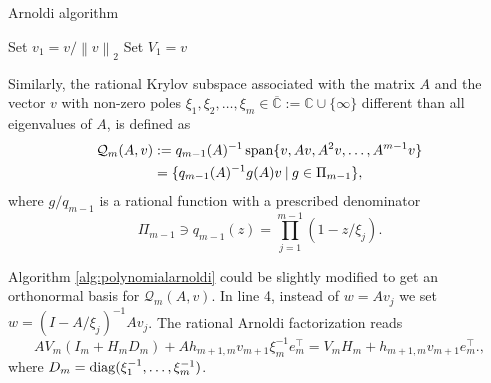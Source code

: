 \begin{algorithm}
    \caption{Arnoldi algorithm}
    \label{alg:polynomialarnoldi}
    Set $v_1 = v / \left\| v \right\|_2$\;
    Set $V_1 = v$\;
        \end{algorithm}

Similarly, the rational Krylov subspace \cite{guttel2013rational} associated with the matrix $A$ and the vector $v$ with non-zero poles
$\xi_1, \xi_2, \dots, \xi_m \in \overline{\mathbb{C}} := \mathbb{C} \cup \{ \infty\}$ different than all eigenvalues of $A$, is defined as
\begin{equation}
    \label{eq:rationalkrylovsubspacedefinition}
    \begin{aligned}
        \mathcal{Q}_m(A, v) & := q_{m-1}(A)^{-1} \operatorname{span}\{v, Av, A^{2}v, \dots, A^{m-1}v \}\\
         & = \{q_{m-1}(A)^{-1} g(A)v \:|\: g \in \Pi_{m-1} \},
    \end{aligned}
\end{equation}
where $g / q_{m-1}$ is a rational function with a prescribed denominator
\begin{equation*}
    \Pi_{m-1} \ni q_{m-1}(z) = \prod_{j=1}^{m-1}(1 - z / \xi_j).
\end{equation*}

Algorithm \ref{alg:polynomialarnoldi} could be slightly modified to get an orthonormal basis for $\mathcal{Q}_m(A, v)$. In line 4, instead
of $w = A v_j$ we set $w = (I - A / \xi_j)^{-1} A v_j$. The rational Arnoldi factorization reads
\begin{equation}
    \label{eq:rationalarnoldifactorization}
    A V_m (I_m + H_m D_m) + A h_{m+1, m} v_{m+1} \xi_m^{-1} e_m^\top = V_m H_m + h_{m+1, m} v_{m+1} e_m^\top.,
\end{equation}
where $D_m = \operatorname{diag}(\xi_1^{-1}, \dots, \xi_m^{-1})$.

